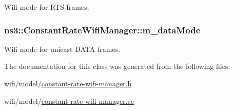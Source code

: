 Wifi mode for R\+TS frames. 

\subsubsection[{\texorpdfstring{m\+\_\+data\+Mode}{m_dataMode}}]{ ns3\+::\+Constant\+Rate\+Wifi\+Manager\+::m\+\_\+data\+Mode\hspace{0.3cm}{\ttfamily [private]}}\hypertarget{classns3_1_1ConstantRateWifiManager_aa38fdd966daf76cbd13376021e2494c3}{}\label{classns3_1_1ConstantRateWifiManager_aa38fdd966daf76cbd13376021e2494c3}


Wifi mode for unicast D\+A\+TA frames. 



The documentation for this class was generated from the following files\+:\begin{DoxyCompactItemize}
\item 
wifi/model/\hyperlink{constant-rate-wifi-manager_8h}{constant-\/rate-\/wifi-\/manager.\+h}\item 
wifi/model/\hyperlink{constant-rate-wifi-manager_8cc}{constant-\/rate-\/wifi-\/manager.\+cc}\end{DoxyCompactItemize}
